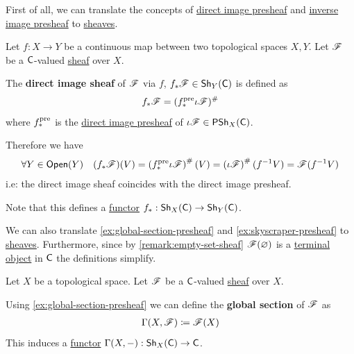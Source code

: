 \documentclass[../../../main]{subfiles}
\begin{document}
First of all, we can translate the concepts of \hyperref[def:direct-image-presheaf]{direct image presheaf} and \hyperref[def:inverse-image-presheaf]{inverse image presheaf} to \hyperref[def:sheaf]{sheaves}.
\begin{definition} \label{def:direct-image-sheaf}
  Let \(f: X \to Y\) be a continuous map between two topological spaces \(X, Y\).
  Let \(\mathscr{F}\) be a \(\mathsf{C}\)-valued \hyperref[def:sheaf]{sheaf} over \(X\).

  The \textbf{direct image sheaf} of \(\mathscr{F}\) via \(f\), \(f_{\ast}\mathscr{F} \in \mathsf{Sh}_{Y}(\mathsf{C})\) is defined as
  \begin{equation*}
    f_{\ast}\mathscr{F} = (f_{\ast}^{\operatorname{pre}}\iota\mathscr{F})^{\#}
  \end{equation*}
  where \(f_{\ast}^{\operatorname*{pre}}\) is the \hyperref[def:direct-image-presheaf]{direct image presheaf} of \(\iota \mathscr{F} \in \mathsf{PSh}_{X}(\mathsf{C})\).

  Therefore we have
  \begin{align*}
    \forall Y \in \mathsf{Open}(Y) \quad (f_{\ast} \mathscr{F})(V) = \left( f_{\ast}^{\operatorname*{pre}}\iota\mathscr{F} \right)^{\#}(V) = \left( \iota\mathscr{F} \right)^{\#}(f^{-1}V) = \mathscr{F}(f^{-1}V)
  \end{align*}
  i.e: the direct image sheaf coincides with the direct image presheaf.

  Note that this defines a \hyperref[def:functor]{functor} \(f_{\ast}: \mathsf{Sh}_{X}(\mathsf{C}) \to \mathsf{Sh}_{Y}(\mathsf{C})\).
\end{definition}

We can also translate \autoref{ex:global-section-presheaf} and \autoref{ex:skyscraper-presheaf} to \hyperref[def:sheaf]{sheaves}.
Furthermore, since by \autoref{remark:empty-set-sheaf} \(\mathscr{F}(\varnothing)\) is a \hyperref[def:initial-terminal-object]{terminal object} in \(\mathsf{C}\) the definitions simplify.
\begin{definition} \label{def:global-section-sheaf}
  Let \(X\) be a topological space.
  Let \(\mathscr{F}\) be a \(\mathsf{C}\)-valued \hyperref[def:sheaf]{sheaf} over \(X\).

  Using \autoref{ex:global-section-presheaf} we can define the \textbf{global section} of \(\mathscr{F}\) as
  \begin{align*}
    \Gamma(X, \mathscr{F}) \coloneq \mathscr{F}(X)
  \end{align*}
  This induces a \hyperref[def:functor]{functor} \(\Gamma(X, -): \mathsf{Sh}_{X}(\mathsf{C}) \to \mathsf{C}\).
\end{definition}
\end{document}
